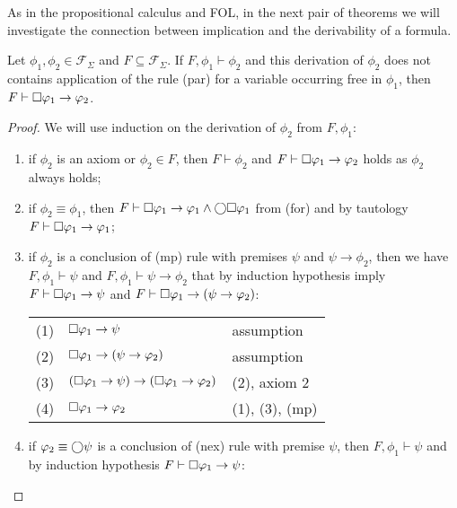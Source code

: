 As in the propositional calculus and \ac{FOL}, in the next pair of theorems we will investigate the connection between
implication and the derivability of a formula.

\begin{theorem}
  Let $\phi_1, \phi_2 \in \mathcal{F}_\Sigma$ and $F \subseteq \mathcal{F}_\Sigma$. If $F, \phi_1 \vdash
  \phi_2$ and this derivation of $\phi_2$ does not contains application of the rule (par) for a variable occurring free
  in $\phi_1$, then $F \vdash \Box{\varphi_1} \to \varphi_2$.
\end{theorem}
\begin{proof}
  We will use induction on the derivation of $\phi_2$ from $F, \phi_1$:
  \begin{enumerate}
    \item if $\phi_2$ is an axiom or $\phi_2 \in F$, then $F \vdash \phi_2$ and $F \vdash \Box{\varphi_1} \to \varphi_2$ holds as
      $\phi_2$ always holds;
    \item if $\phi_2 \equiv \phi_1$, then $F \vdash \Box{\varphi_1} \to \varphi_1 \land \bigcirc{\Box{\varphi_1}}$ from
      (for) and by tautology $F \vdash \Box{\varphi_1} \to \varphi_1$;
    \item if $\phi_2$ is a conclusion of (mp) rule with premises $\psi$ and $\psi \to \phi_2$, then we have $F, \phi_1 \vdash
      \psi$ and $F, \phi_1 \vdash \psi \to \phi_2$ that by induction hypothesis imply $F \vdash \Box{\varphi_1} \to \psi$
      and $F \vdash \Box{\varphi_1} \to (\psi \to \varphi_2)$:

      \begin{tabularx}{300pt}{cXl}
        (1) & $\Box{\varphi_1} \to \psi$ & assumption \\
        (2) & $\Box{\varphi_1} \to (\psi \to \varphi_2)$ & assumption \\
        (3) & $(\Box{\varphi_1} \to \psi) \to (\Box{\varphi_1} \to \varphi_2)$ & (2), axiom 2 \\
        (4) & $\Box{\varphi_1} \to \varphi_2$ & (1), (3), (mp) \\
      \end{tabularx}
    \item if $\varphi_2 \equiv \bigcirc{\psi}$ is a conclusion of (nex) rule with premise $\psi$, then $F, \phi_1 \vdash \psi$
      and by induction hypothesis $F \vdash \Box{\varphi_1} \to \psi$:


\end{enumerate}
\end{proof}
